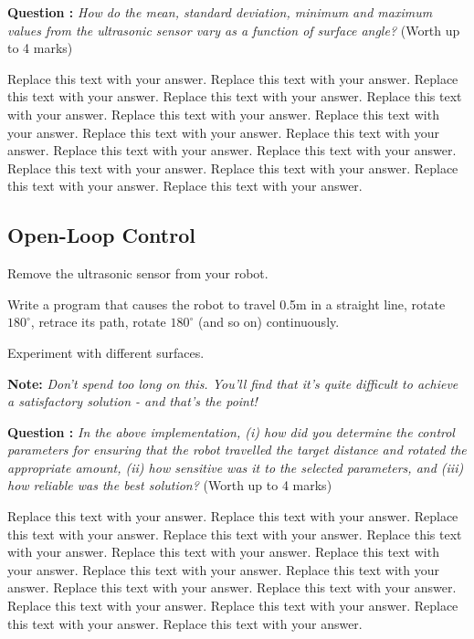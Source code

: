 \documentclass[hidelinks,a4paper,11pt]{article}
\newcounter{question}
\newcommand\myq{\refstepcounter{question}\thequestion}
\begin{document}
{\bfseries Question \myq:}  \emph{How do the mean, standard deviation, minimum and maximum values from the ultrasonic sensor vary as a function of surface angle?} (Worth up to 4 marks)\\
\begin{mdframed}
Replace this text with your answer.  Replace this text with your answer.  Replace this text with your answer.  Replace this text with your answer.  Replace this text with your answer.  Replace this text with your answer.  Replace this text with your answer.  Replace this text with your answer.  Replace this text with your answer.  Replace this text with your answer.  Replace this text with your answer.  Replace this text with your answer.  Replace this text with your answer.  Replace this text with your answer.  Replace this text with your answer.
\end{mdframed}
\vspace*{\baselineskip}


\subsection{Open-Loop Control}

\begin{todolist}
	\item Remove the ultrasonic sensor from your robot.
	\item Write a program that causes the robot to travel 0.5m in a straight line, rotate $180^{\circ}$, retrace its path, rotate $180^{\circ}$ (and so on) continuously.
	\item Experiment with different surfaces.
\end{todolist}

{\bfseries Note:}  \emph{Don't spend too long on this.  You'll find that it's quite difficult to achieve a satisfactory solution - and that's the point!}

{\bfseries Question \myq:}  \emph{In the above implementation, (i) how did you determine the control parameters for ensuring that the robot travelled the target distance and rotated the appropriate amount, (ii) how sensitive was it to the selected parameters, and (iii) how reliable was the best solution?} (Worth up to 4 marks)\\
\begin{mdframed}
Replace this text with your answer.  Replace this text with your answer.  Replace this text with your answer.  Replace this text with your answer.  Replace this text with your answer.  Replace this text with your answer.  Replace this text with your answer.  Replace this text with your answer.  Replace this text with your answer.  Replace this text with your answer.  Replace this text with your answer.  Replace this text with your answer.  Replace this text with your answer.  Replace this text with your answer.  Replace this text with your answer.
\end{mdframed}
\vspace*{\baselineskip}
\end{document}
